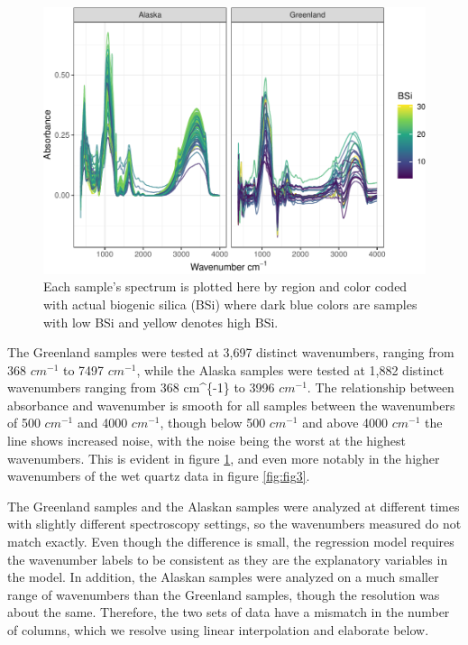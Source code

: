 \documentclass[water,article,submit,moreauthors,pdftex]{mdpi}
\begin{document}
\begin{figure}

{\centering \includegraphics{final_paper_draft_files/figure-latex/fig2-1} 

}

\caption{Each sample’s spectrum is plotted here by region and color coded with actual biogenic silica (BSi) where dark blue colors are samples with low BSi and yellow denotes high BSi.}\label{fig:fig2}
\end{figure}

The Greenland samples were tested at 3,697 distinct wavenumbers, ranging
from 368 \(cm^{-1}\) to 7497 \(cm^{-1}\), while the Alaska samples were
tested at 1,882 distinct wavenumbers ranging from 368 cm\^{}\{-1\} to
3996 \(cm^{-1}\). The relationship between absorbance and wavenumber is
smooth for all samples between the wavenumbers of 500 \(cm^{-1}\) and
4000 \(cm^{-1}\), though below 500 \(cm^{-1}\) and above 4000
\(cm^{-1}\) the line shows increased noise, with the noise being the
worst at the highest wavenumbers. This is evident in figure
\ref{fig:fig2}, and even more notably in the higher wavenumbers of the
wet quartz data in figure \ref{fig:fig3}.

The Greenland samples and the Alaskan samples were analyzed at different
times with slightly different spectroscopy settings, so the wavenumbers
measured do not match exactly. Even though the difference is small, the
regression model requires the wavenumber labels to be consistent as they
are the explanatory variables in the model. In addition, the Alaskan
samples were analyzed on a much smaller range of wavenumbers than the
Greenland samples, though the resolution was about the same. Therefore,
the two sets of data have a mismatch in the number of columns, which we
resolve using linear interpolation and elaborate below.
\end{document}
